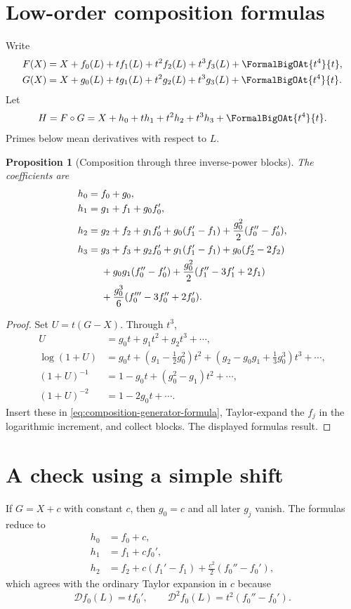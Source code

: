 \documentclass[11pt,oneside]{book}
\newtheorem{proposition}[theorem]{Proposition}
\theoremstyle{definition}
\theoremstyle{remark}
\newcommand{\D}{\mathcal D}
\newcommand{\compose}{\mathbin{\circ}}
\begin{document}
\section{Low-order composition formulas}
Write
\begin{align}\label{eq:F-G-coeff-notation}
 F(X)&=X+f_0(L)+t f_1(L)+t^2f_2(L)+t^3f_3(L)+\FormalBigOAt{t^4}{t},\\
 G(X)&=X+g_0(L)+t g_1(L)+t^2g_2(L)+t^3g_3(L)+\FormalBigOAt{t^4}{t}.
\end{align}
Let
\[
 H=F\compose G
 =X+h_0+t h_1+t^2h_2+t^3h_3+\FormalBigOAt{t^4}{t}.
\]
Primes below mean derivatives with respect to $L$.

\begin{proposition}[Composition through three inverse-power blocks]
\label{prop:composition-first-blocks}
The coefficients are
\begin{align}
 h_0={}&f_0+g_0,\label{eq:h0}\\
 h_1={}&g_1+f_1+g_0f_0',\label{eq:h1}\\
 h_2={}&g_2+f_2+g_1f_0'
 +g_0(f_1'-f_1)
 +\frac{g_0^2}{2}(f_0''-f_0'),\label{eq:h2}\\
 h_3={}&g_3+f_3+g_2f_0'
 +g_1(f_1'-f_1)+g_0(f_2'-2f_2)\notag\\
 &+g_0g_1(f_0''-f_0')
 +\frac{g_0^2}{2}(f_1''-3f_1'+2f_1)\notag\\
 &+\frac{g_0^3}{6}(f_0'''-3f_0''+2f_0').
 \label{eq:h3}
\end{align}
\end{proposition}
\begin{proof}
Set $U=t(G-X)$.  Through $t^3$,
\begin{align*}
 U&=g_0t+g_1t^2+g_2t^3+\cdots,\\
 \log(1+U)
 &=g_0t+\left(g_1-\frac12g_0^2\right)t^2
 +\left(g_2-g_0g_1+\frac13g_0^3\right)t^3+\cdots,\\
 (1+U)^{-1}
 &=1-g_0t+(g_0^2-g_1)t^2+\cdots,\\
 (1+U)^{-2}
 &=1-2g_0t+\cdots.
\end{align*}
Insert these in \eqref{eq:composition-generator-formula}, Taylor-expand the
$f_j$ in the logarithmic increment, and collect blocks.  The displayed
formulas result.
\end{proof}

\section{A check using a simple shift}
If $G=X+c$ with constant $c$, then $g_0=c$ and all later $g_j$ vanish.  The
formulas reduce to
\begin{align*}
 h_0&=f_0+c,\\
 h_1&=f_1+cf_0',\\
 h_2&=f_2+c(f_1'-f_1)+\frac{c^2}{2}(f_0''-f_0'),
\end{align*}
which agrees with the ordinary Taylor expansion in $c$ because
\[
 \D f_0(L)=tf_0',
 \qquad
 \D^2 f_0(L)=t^2(f_0''-f_0').
\]
\end{document}
